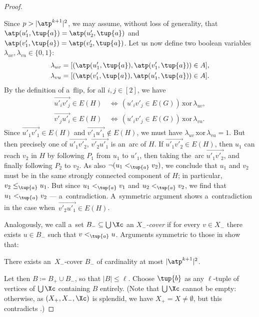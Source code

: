 \begin{proof}
\begin{claimproof}
        Since $p > |\atp^{k+1}|^2$, we may assume, without loss of generality, that $\atp(u'_1, \tup{a}) = \atp(u'_2, \tup{a})$ and $\atp(v'_1, \tup{a}) = \atp(v'_2, \tup{a})$.
        Let us now define two boolean variables $\lambda_{uv}, \lambda_{vu} \in \{0, 1\}$:
        \[ \begin{split}
            \lambda_{uv} &= [(\atp(u'_1, \tup{a}), \atp(v'_1, \tup{a})) \in A], \\
            \lambda_{vu} &= [(\atp(v'_1, \tup{a}), \atp(u'_1, \tup{a})) \in A].
        \end{split} \]
        By the definition of a~flip, for all $i, j \in [2]$, we have
        \[ \begin{split}
            \vec{u'_i v'_j} \in E(H) \,&\Longleftrightarrow\, (u'_i v'_j \in E(G)) \,\textrm{xor}\, \lambda_{uv}, \\
            \vec{v'_j u'_i} \in E(H) \,&\Longleftrightarrow\, (u'_i v'_j \in E(G)) \,\textrm{xor}\, \lambda_{vu}.
        \end{split} \]
        Since $\vec{u'_1 v'_1} \in E(H)$ and $\vec{v'_1 u'_1} \notin E(H)$, we must have $\lambda_{uv} \,\textrm{xor}\, \lambda_{vu} = 1$.
        But then precisely one of $\vec{u'_1 v'_2}$, $\vec{v'_2 u'_1}$ is an~arc of $H$.
        If $\vec{u'_1 v'_2} \in E(H)$, then $u_1$ can reach $v_2$ in $H$ by following $P_1$ from $u_1$ to $u'_1$, then taking the~arc $\vec{u'_1 v'_2}$, and finally following $P_2$ to $v_2$.
        As also $\neg (u_1 <_{\tup{a}} v_2)$, we conclude that $u_1$ and $v_2$ must be in the same strongly connected component of $H$; in particular, $v_2 \leq_{\tup{a}} u_1$.
        But since $u_1 <_{\tup{a}} v_1$ and $u_2 <_{\tup{a}} v_2$, we find that $u_1 <_{\tup{a}} v_2$ --- a~contradiction.
        A~symmetric argument shows a~contradiction in the case when~$\vec{v'_2 u'_1} \in E(H)$.
    \end{claimproof}

    Analogously, we call a~set $B_- \subseteq \bigcup \Xc$ an \emph{$X_-$-cover} if for every $v \in X_-$ there exists $u \in B_-$ such that $v <_{\tup{a}} u$.
    Arguments symmetric to those in  show that:

    \begin{claim}
        \label{cl:small-lower-covering}
        There exists an~$X_-$-cover $B_-$ of cardinality at most $|\atp^{k+1}|^2$.
    \end{claim}

    Let then $B \coloneqq B_+ \cup B_-$, so that $|B| \leq \ell$. Choose $\tup{b}$ as any $\ell$-tuple of vertices of $\bigcup \Xc$ containing $B$ entirely.
    (Note that $\bigcup \Xc$ cannot be empty: otherwise, as $(X_+, X_-, \Xc)$ is splendid, we have $X_+ = X \neq \emptyset$, but this contradicts .)


\end{proof}
